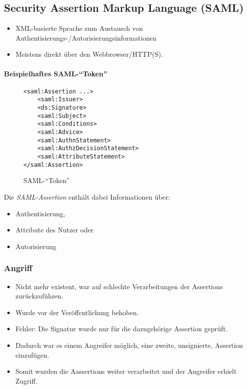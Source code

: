 		\subsection{Security Assertion Markup Language (SAML)}
			\begin{itemize}
				\item XML-basierte Sprache zum Austausch von Authentisierungs-/Autorisierungsinformationen
				\item Meistens direkt über den Webbrowser/HTTP(S).
			\end{itemize}

			\paragraph{Beispielhaftes SAML-\enquote{Token}}
				\begin{figure}[H]
					\centering
					\begin{verbatim}
<saml:Assertion ...>
	<saml:Issuer>
	<ds:Signature>
	<saml:Subject>
	<saml:Conditions>
	<saml:Advice>
	<saml:AuthnStatement>
	<saml:AuthzDecisionStatement>
	<saml:AttributeStatement>
</saml:Assertion>
\end{verbatim}
					\caption{SAML-\enquote{Token}}
				\end{figure}
				Die \textit{SAML-Assertion} enthält dabei Informationen über:
				\begin{itemize}
					\item Authentisierung,
					\item Attribute des Nutzer oder
					\item Autorisierung
				\end{itemize}

			\subsubsection{Angriff}
				\begin{itemize}
					\item Nicht mehr existent, war auf schlechte Verarbeitungen der Assertions zurückzuführen.
					\item Wurde vor der Veröffentlichung behoben.
					\item Fehler: Die Signatur wurde nur für die dazugehörige Assertion geprüft.
					\item Dadurch war es einem Angreifer möglich, eine zweite, unsignierte, Assertion einzufügen.
					\item Somit wurden die Aassertions weiter verarbeitet und der Angreifer erhielt Zugriff.
				\end{itemize}

